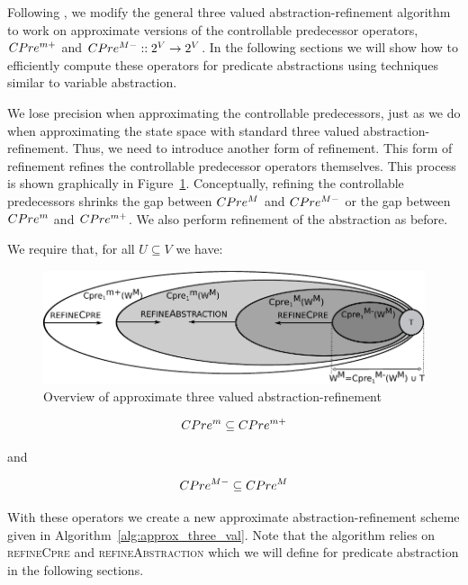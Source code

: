 Following \cite{Alfaro_Roy_07}, we modify the general three valued abstraction-refinement algorithm to work on approximate versions of the controllable predecessor operators, $CPre^{m+}$ and $CPre^{M-} :: 2^V \rightarrow 2^V$. In the following sections we will show how to efficiently compute these operators for predicate abstractions using techniques similar to variable abstraction. 

We lose precision when approximating the controllable predecessors, just as we do when approximating the state space with standard three valued abstraction-refinement. Thus, we need to introduce another form of refinement. This form of refinement refines the controllable predecessor operators themselves. This process is shown graphically in Figure~\ref{fig:approx_three_val_overview}. Conceptually, refining the controllable predecessors shrinks the gap between $CPre^M$ and $CPre^{M-}$ or the gap between $CPre^m$ and $CPre^{m+}$. We also perform refinement of the abstraction as before.

We require that, for all $U \subseteq V$ we have:

\begin{figure}
\centering
\includegraphics[width=0.85\linewidth]{imgs/approxThreeValue.pdf}
\caption{Overview of approximate three valued abstraction-refinement}
\label{fig:approx_three_val_overview}
\end{figure}


\begin{equation}
\label{eqn:cpre_p1}
CPre^m \subseteq CPre^{m+}
\end{equation}

\noindent and

\begin{equation}
\label{eqn:cpre_p2}
CPre^{M-} \subseteq CPre^M
\end{equation}

With these operators we create a new approximate abstraction-refinement scheme given in Algorithm~\ref{alg:approx_three_val}. Note that the algorithm relies on \textsc{refineCpre} and \textsc{refineAbstraction} which we will define for predicate abstraction in the following sections.

